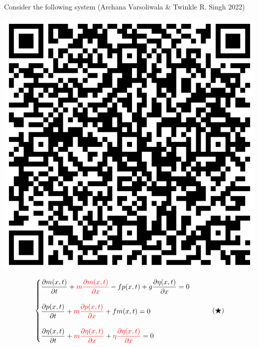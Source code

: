 \begin{example}
    Consider the following system (Archana Varsoliwala \& Twinkle R. Singh 2022)
    \par
    \begin{minipage}{0.25\textwidth}
        \hspace*{1cm}\includegraphics[scale=.08]{archana_link.png}
    \end{minipage}
    \begin{minipage}{0.75\textwidth}
        \begin{equation}
            \begin{cases}
                \displaystyle \pdv{m(x,t)}{t} + \textcolor{red}{m \pdv{m(x,t)}{x}} - fp(x,t) + g\pdv{\eta(x,t)}{x} = 0
                \\\\
                \displaystyle \pdv{p(x,t)}{t} + \textcolor{red}{m \pdv{p(x,t)}{x}} + fm(x,t) = 0
                \\\\
                \displaystyle \pdv{\eta(x,t)}{t} + \textcolor{red}{m \pdv{\eta(x,t)}{x}} + \textcolor{red}{\eta\pdv{\eta(x,t)}{x}} = 0
            \end{cases}
            \tag{$\bigstar$}
        \end{equation}
    \end{minipage}

\end{example}
